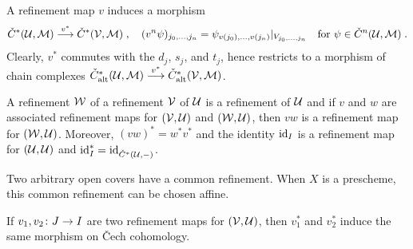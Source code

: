 \documentclass[a4paper,parskip=half,numbers=enddot, DIV=12]{scrreprt}
\newcommand{\vC}{\v{C}}
\begin{document}
A refinement map $v$ induces a morphism
\begin{align*}
	\check{C}^*(\Uu,\Mm)\morphism[v^*]\check{C}^*(\Vv,\Mm)\;,\quad(v^n\psi)_{j_0,\ldots,j_n}=\psi_{v(j_0),\ldots,v(j_n)}|_{V_{j_0,\ldots,j_n}}\quad\text{for }\psi\in\check{C}^n(\Uu,\Mm)\;.
\end{align*}
Clearly, $v^*$ commutes with the $d_j$, $s_j$, and $t_j$, hence restricts to a morphism of chain complexes $\check{C}_\alt^*(\Uu,\Mm)\morphism[v^*]\check{C}_\alt^*(\Vv,\Mm)$.
\begin{lem}
	\begin{alphanumerate}
		\item {}A refinement $\mathcal{W}$ of a refinement $\mathcal{V}$ of $\mathcal{U}$ is a refinement of $\mathcal{U}$ and if $v$ and $w$ are associated refinement maps for $(\mathcal{V},\mathcal{U})$ and $(\mathcal{W},\mathcal{U})$, then $vw$ is a refinement map for $(\mathcal{W},\mathcal{U})$. Moreover, $(vw)^*=w^*v^*$ and the identity $\operatorname{id}_I$ is a refinement map for $(\mathcal{U},\mathcal{U})$ and $\operatorname{id}_I^*=\operatorname{id}_{\check{C}^*(\mathcal{U},-)}$.
		\item Two arbitrary open covers have a common refinement. When $X$ is a prescheme, this common refinement can be chosen affine.
		\item If $v_1,v_2\colon J\morphism I$ are two refinement maps for $(\mathcal{V},\mathcal{U})$, then $v_1^*$ and $v_2^*$ induce the same morphism on \vC ech cohomology.
	\end{alphanumerate}
\end{lem}
\end{document}
